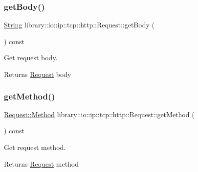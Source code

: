 \subsubsection{\texorpdfstring{get\+Body()}{getBody()}}
{\footnotesize\ttfamily \hyperlink{namespacelibrary_1_1io_1_1ip_1_1tcp_1_1http_a1c435ea1e3614d52139da88a36632815}{String} library\+::io\+::ip\+::tcp\+::http\+::\+Request\+::get\+Body (\begin{DoxyParamCaption}{ }\end{DoxyParamCaption}) const}



Get request body. 

\begin{DoxyReturn}{Returns}
\hyperlink{classlibrary_1_1io_1_1ip_1_1tcp_1_1http_1_1_request}{Request} body 
\end{DoxyReturn}
\mbox{\label{classlibrary_1_1io_1_1ip_1_1tcp_1_1http_1_1_request_a330afb31317aeb20e0973c143f49ef8a}} 
\subsubsection{\texorpdfstring{get\+Method()}{getMethod()}}
{\footnotesize\ttfamily \hyperlink{classlibrary_1_1io_1_1ip_1_1tcp_1_1http_1_1_request_a45baccf3aec384fbdbbf6ce411f11bd7}{Request\+::\+Method} library\+::io\+::ip\+::tcp\+::http\+::\+Request\+::get\+Method (\begin{DoxyParamCaption}{ }\end{DoxyParamCaption}) const}



Get request method. 

\begin{DoxyReturn}{Returns}
\hyperlink{classlibrary_1_1io_1_1ip_1_1tcp_1_1http_1_1_request}{Request} method 
\end{DoxyReturn}
\mbox{\label{classlibrary_1_1io_1_1ip_1_1tcp_1_1http_1_1_request_a77856e25f50a6e186e45a8650cc971aa}} 
